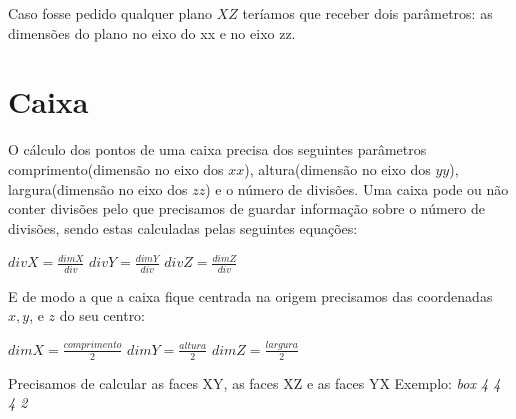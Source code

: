 \documentclass{article}
\begin{document}
Caso fosse pedido qualquer plano $XZ$ teríamos que receber dois parâmetros: as dimensões do plano no eixo do xx e no eixo zz. 
\newpage
\section{Caixa}
O cálculo dos pontos de uma caixa precisa dos seguintes parâmetros comprimento(dimensão no eixo dos $xx$), altura(dimensão no eixo dos $yy$), largura(dimensão no eixo dos $zz$) e o número de divisões. 
Uma caixa pode ou não conter divisões pelo que precisamos de guardar informação sobre o número de divisões, sendo estas calculadas pelas seguintes equações:
\begin{center}
$divX = \frac{dimX}{div}$ \newline\newline
$divY = \frac{dimY}{div}$ \newline\newline
$divZ = \frac{dimZ}{div}$ \newline\newline
\end{center}
E de modo a que a caixa fique centrada na origem precisamos das coordenadas $x,y$, e $z$ do seu centro:
\begin{center}
$dimX = \frac{comprimento}{2}$ \newline\newline
$dimY = \frac{altura}{2}$ \newline\newline
$dimZ = \frac{largura}{2}$ \newline\newline
\end{center}
Precisamos de calcular as faces XY, as faces XZ e as faces YX\newline
Exemplo: \textit{box 4 4 4 2}
\end{document}
